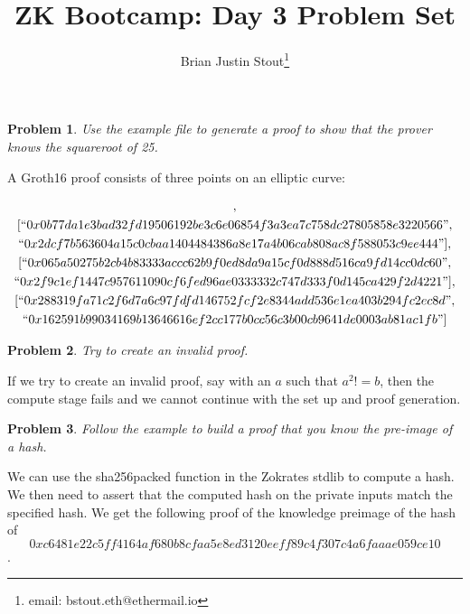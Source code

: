 \documentclass[12pt,letterpaper]{article}
\theoremstyle{plain}
\newtheorem{prb}{Problem}
\theoremstyle{definition}
\begin{document}
\title{ZK Bootcamp: Day 3 Problem Set}
\author{Brian Justin Stout\footnote{email: bstout.eth@ethermail.io}}
\maketitle

\begin{prb}\label{P1}
Use the example file to generate a proof to show that the prover knows the squareroot of 25.
\end{prb}

A Groth16 proof consists of three points on an elliptic curve:

\begin{gather*}
[``0x168ac11550698217d0a8c8dccb9d63222a0eeb078af62d80f65455a043458761",\\
``0x2f63877dbc29a005f64b36150aa45df93fe6efbbd0489515422f0ebcd75ab6e0"],\\
[``0x0b77da1e3bad32fd19506192be3c6e06854f3a3ea7c758dc27805858e3220566",\\
``0x2dcf7b563604a15c0cbaa1404484386a8e17a4b06cab808ac8f588053c9ee444"],\\
[``0x065a50275b2cb4b83333accc62b9f0ed8da9a15cf0d888d516ca9fd14cc0dc60",\\
``0x2f9c1ef1447c957611090cf6fed96ae0333332c747d333f0d145ca429f2d4221"],\\
[``0x288319fa71c2f6d7a6c97fdfd146752fcf2e8344add536e1ea403b294fc2ec8d",\\
``0x162591b99034169b13646616ef2cc177b0cc56c3b00cb9641de0003ab81ac1fb"]
\end{gather*}

\begin{prb}\label{P2}
Try to create an invalid proof.
\end{prb}
If we try to create an invalid proof, say with an $a$ such that $a^2!=b$, then the compute stage fails and we cannot continue with the set up and proof generation.

\begin{prb}\label{P3}
Follow the example to build a proof that you know the pre-image of a hash.
\end{prb}

We can use the sha256packed function in the Zokrates stdlib to compute a hash. We then need to assert that the computed hash on the private inputs match the specified hash. We get the following proof of the knowledge preimage of the hash of $$0xc6481e22c5ff4164af680b8cfaa5e8ed3120eeff89c4f307c4a6faaae059ce10$$.
\end{document}
